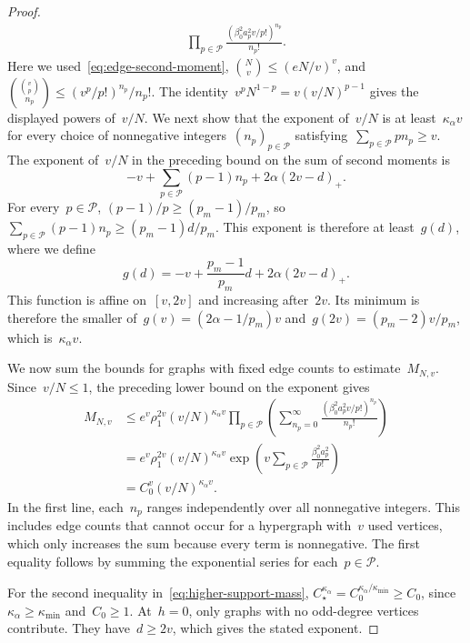 \documentclass[letterpaper,11pt,reqno]{amsart}
\renewcommand{\leq}{\leqslant}
\renewcommand{\geq}{\geqslant}
\begin{document}
\begin{proof}
\begin{align*}
\prod_{p\in\mathcal P}\frac{(\beta_0^2a_p^2v/p!)^{n_p}}{n_p!}.
\end{align*}
Here we used~\eqref{eq:edge-second-moment}, $\binom Nv\leq(eN/v)^v$, and~$\binom{\binom vp}{n_p}\leq(v^p/p!)^{n_p}/n_p!$. The identity~$v^pN^{1-p}=v(v/N)^{p-1}$ gives the displayed powers of~$v/N$.
We next show that the exponent of~$v/N$ is at least~$\kappa_\alpha v$ for every choice of nonnegative integers~$(n_p)_{p\in\mathcal P}$ satisfying~$\sum_{p\in\mathcal P}pn_p\geq v$. The exponent of~$v/N$ in the preceding bound on the sum of second moments is
\begin{equation*}
-v+\sum_{p\in\mathcal P}(p-1)n_p+2\alpha(2v-d)_+.
\end{equation*}
For every~$p\in\mathcal P$, $(p-1)/p\geq(p_m-1)/p_m$, so~$\sum_{p\in\mathcal P}(p-1)n_p\geq(p_m-1)d/p_m$. This exponent is therefore at least~$g(d)$, where we define
\begin{equation*}
g(d)=-v+\frac{p_m-1}{p_m}d+2\alpha(2v-d)_+.
\end{equation*}
This function is affine on~$[v,2v]$ and increasing after~$2v$. Its minimum is therefore the smaller of~$g(v)=(2\alpha-1/p_m)v$ and~$g(2v)=(p_m-2)v/p_m$, which is~$\kappa_\alpha v$.

We now sum the bounds for graphs with fixed edge counts to estimate~$M_{N,v}$. Since~$v/N\leq1$, the preceding lower bound on the exponent gives
\begin{align*}
M_{N,v}
&\leq e^v\rho_1^{2v}(v/N)^{\kappa_\alpha v}
\prod_{p\in\mathcal P}\left(\sum_{n_p=0}^{\infty}
\frac{(\beta_0^2a_p^2v/p!)^{n_p}}{n_p!}\right)\\
&=e^v\rho_1^{2v}(v/N)^{\kappa_\alpha v}
\exp\!\left(v\sum_{p\in\mathcal P}\frac{\beta_0^2a_p^2}{p!}\right)\\
&=C_0^v(v/N)^{\kappa_\alpha v}.
\end{align*}
In the first line, each~$n_p$ ranges independently over all nonnegative integers. This includes edge counts that cannot occur for a hypergraph with~$v$ used vertices, which only increases the sum because every term is nonnegative. The first equality follows by summing the exponential series for each~$p\in\mathcal P$.

For the second inequality in~\eqref{eq:higher-support-mass}, $C_\star^{\kappa_\alpha}=C_0^{\kappa_\alpha/\kappa_{\min}}\geq C_0$, since~$\kappa_\alpha\geq\kappa_{\min}$ and~$C_0\geq1$. At~$h=0$, only graphs with no odd-degree vertices contribute. They have~$d\geq2v$, which gives the stated exponent.
\end{proof}
\end{document}
